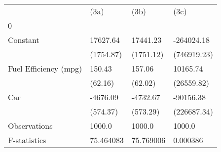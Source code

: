 \begin{tabular}{llll}
\toprule
{} &       (3a) &       (3b) &         (3c) \\
0                     &            &            &              \\
\midrule
Constant              &   17627.64 &   17441.23 &   -264024.18 \\
                      &  (1754.87) &  (1751.12) &  (746919.23) \\
Fuel Efficiency (mpg) &     150.43 &     157.06 &     10165.74 \\
                      &    (62.16) &    (62.02) &   (26559.82) \\
Car                   &   -4676.09 &   -4732.67 &    -90156.38 \\
                      &   (574.37) &   (573.29) &  (226687.34) \\
Observations          &     1000.0 &     1000.0 &       1000.0 \\
F-statistics          &  75.464083 &  75.769006 &     0.000386 \\
\bottomrule
\end{tabular}
